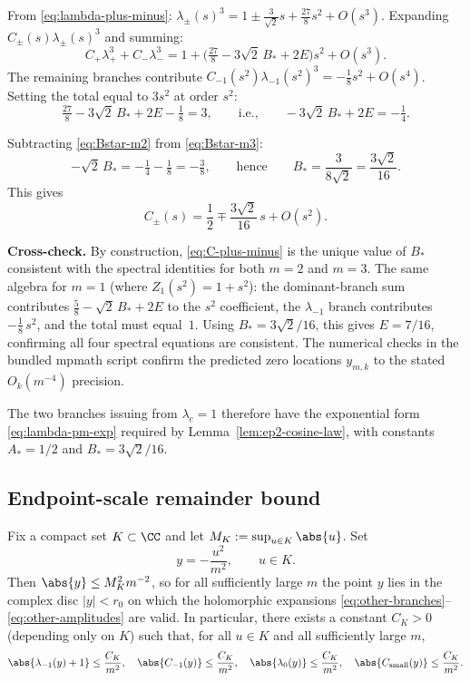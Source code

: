 From \eqref{eq:lambda-plus-minus}: $\lambda_\pm(s)^3=1\pm\tfrac{3}{\sqrt2}s+\tfrac{27}{8}s^2+O(s^3)$.
Expanding $C_\pm(s)\lambda_\pm(s)^3$ and summing:
\[
C_+\lambda_+^3+C_-\lambda_-^3
= 1+\bigl(\tfrac{27}{8}-3\sqrt2\,B_*+2E\bigr)s^2+O(s^3).
\]
The remaining branches contribute $C_{-1}(s^2)\lambda_{-1}(s^2)^3=-\tfrac{1}{8}s^2+O(s^4)$.
Setting the total equal to $3s^2$ at order $s^2$:
\begin{equation}\label{eq:Bstar-m3}
\tfrac{27}{8} - 3\sqrt2\,B_* + 2E - \tfrac18 = 3,
\qquad\text{i.e.,}\qquad
-3\sqrt2\,B_* + 2E = -\tfrac14.
\end{equation}

Subtracting \eqref{eq:Bstar-m2} from \eqref{eq:Bstar-m3}:
\[
-\sqrt2\,B_* = -\tfrac14-\tfrac18 = -\tfrac38,
\qquad\text{hence}\qquad
B_* = \frac{3}{8\sqrt2} = \frac{3\sqrt2}{16}.
\]
This gives
\begin{equation}\label{eq:C-plus-minus}
C_\pm(s)
=
\frac12\mp \frac{3\sqrt2}{16}\,s+O(s^2).
\end{equation}

\textbf{Cross-check.}
By construction, \eqref{eq:C-plus-minus} is the unique value of $B_*$ consistent with the spectral identities for both $m=2$ and $m=3$.
The same algebra for $m=1$ (where $Z_1(s^2)=1+s^2$): the dominant-branch sum contributes $\tfrac58-\sqrt2\,B_*+2E$ to the $s^2$ coefficient, the $\lambda_{-1}$ branch contributes $-\tfrac18\,s^2$, and the total must equal~$1$.
Using $B_*=3\sqrt2/16$, this gives $E=7/16$, confirming all four spectral equations are consistent.
The numerical checks in the bundled mpmath script confirm the predicted zero locations $y_{m,k}$ to the stated $O_k(m^{-4})$ precision.

The two branches issuing from $\lambda_c=1$ therefore have the exponential form \eqref{eq:lambda-pm-exp} required by Lemma~\ref{lem:ep2-cosine-law}, with constants $A_*=1/2$ and $B_*=3\sqrt2/16$.

\subsection{Endpoint-scale remainder bound}

Fix a compact set \(K\subset\CC\) and let \(M_K:=\sup_{u\in K}\abs{u}\).
Set
\[
y=-\frac{u^2}{m^2},
\qquad u\in K.
\]
Then \(\abs{y}\le M_K^2m^{-2}\), so for all sufficiently large \(m\) the point \(y\) lies in the complex disc \(|y|<r_0\) on which the holomorphic expansions \eqref{eq:other-branches}--\eqref{eq:other-amplitudes} are valid.
In particular, there exists a constant \(C_K>0\) (depending only on \(K\)) such that, for all \(u\in K\) and all sufficiently large \(m\),
\begin{equation}\label{eq:y-bound}
\abs{\lambda_{-1}(y)+1}\le \frac{C_K}{m^2},
\quad
\abs{C_{-1}(y)}\le \frac{C_K}{m^2},
\quad
\abs{\lambda_0(y)}\le \frac{C_K}{m^2},
\quad
\abs{C_{\mathrm{small}}(y)}\le \frac{C_K}{m^2}.
\end{equation}


